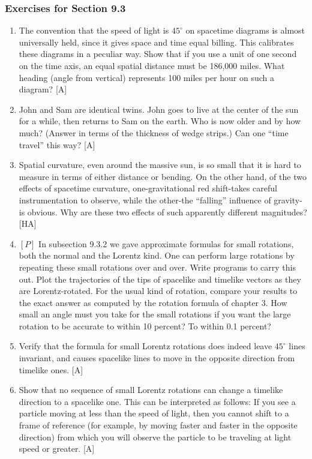 \documentclass{book}
\begin{document}
\subsubsection{Exercises for Section 9.3}
\begin{enumerate}
\item The convention that the speed of light is $45^{\circ}$ on spacetime diagrams
is almost universally held, since it gives space and time equal billing.
This calibrates these diagrams in a peculiar way. Show that if you use
a unit of one second on the time axis, an equal spatial distance must be
186,000 miles. What heading (angle from vertical) represents 100 miles
per hour on such a diagram? [A]

\item John and Sam are identical twins. John goes to live at the center of
the sun for a while, then returns to Sam on the earth. Who is now older
and by how much? (Answer in terms of the thickness of wedge strips.)
Can one ``time travel'' this way? [A]

\item Spatial curvature, even around the massive sun, is so small that it is
hard to measure in terms of either distance or bending. On the other
hand, of the two effects of spacetime curvature, one-gravitational red
shift-takes careful instrumentation to observe, while the other-the
``falling'' influence of gravity-is obvious. Why are these two effects of
such apparently different magnitudes? [HA]

\item $[P]$ In subsection 9.3.2 we gave approximate formulas for small rotations, both the normal and the Lorentz kind. One can perform large
rotations by repeating these small rotations over and over. Write programs to carry this out. Plot the trajectories of the tips of spacelike
and timelike vectors as they are Lorentz-rotated. For the usual kind of
rotation, compare your results to the exact answer as computed by the
rotation formula of chapter 3. How small an angle must you take for the
small rotations if you want the large rotation to be accurate to within
10 percent? To within 0.1 percent?

\item Verify that the formula for small Lorentz rotations does indeed leave
$45^{\circ}$ lines invariant, and causes spacelike lines to move in the opposite
direction from timelike ones. [A]

\item Show that no sequence of small Lorentz rotations can change a
timelike direction to a spacelike one. This can be interpreted as follows:
If you see a particle moving at less than the speed of light, then you
cannot shift to a frame of reference (for example, by moving faster and
faster in the opposite direction) from which you will observe the particle
to be traveling at light speed or greater. [A]


\end{enumerate}
\end{document}
